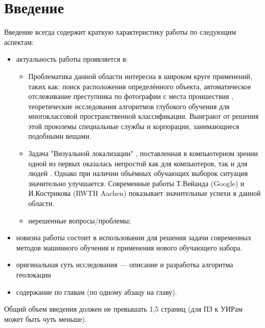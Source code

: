 \chapter*{Введение}
\label{sec:afterwords}

Введение всегда содержит краткую характеристику работы по следующим аспектам:

\begin{itemize}
	\item актуальность работы проявляется в:
	\begin{itemize}
		\item Проблематика данной области интересна в широком круге применений, таких как: 
		поиск расположения определённого объекта, автоматическое отслеживание преступника по фотографии с места проишествия , теоретические исследования алгоритмов глубокого обучения для многоклассовой пространственной классификации. Выиграют от решения этой проюлемы специальные службы и корпорации, занимающиеся подобными вещами.
		\item Задача "Визуальной локализации" \cite{im2gps}, поставленная в компьютерном зрении одной из первых оказалась непростой как для компьютеров, так и для людей \cite{Thompson1999geomReas}. Однако при наличии объёмных обучающих выборок ситуация значительно улучшается. Современные работы Т.Вейанда (Google) и И.Кострикова (RWTH Aachen) \cite{weyand2016planet} показывает значительные успехи в данной области.
		\item нерешенные вопросы/проблемы;
	\end{itemize}
	\item новизна работы состоит в использовании для решения задачи современных методов машинного обучения и применения нового обучающего набора.
	\item оригинальная суть исследования --- описание и разработка алгоритма геолокации
	\item содержание по главам (по одному абзацу на главу).
\end{itemize}

Общий объем введения должен не превышать 1,5 страниц (для ПЗ к УИРам может быть чуть меньше).


